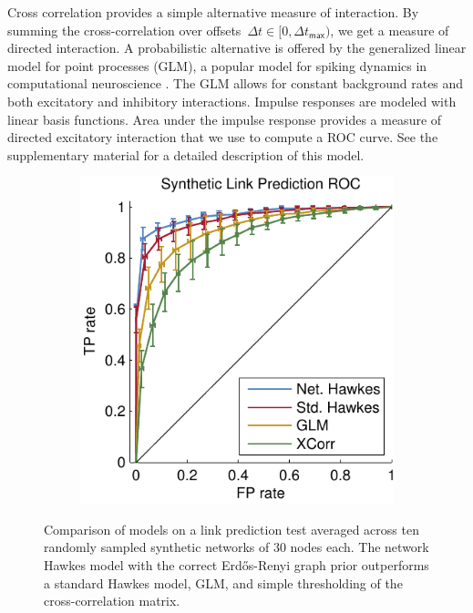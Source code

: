 Cross correlation provides a simple alternative measure of interaction. By summing the cross-correlation over offsets~${\Delta t\in[0,\Delta t_{\mathsf{max}})}$, we get a measure of directed interaction. A probabilistic alternative is offered by the generalized linear model for point processes (GLM), a popular model for spiking dynamics in computational neuroscience \cite{Paninski-2004}. The GLM allows for constant background rates and both excitatory and inhibitory interactions. Impulse responses are modeled with linear basis functions. Area under the impulse response provides a measure of directed excitatory interaction that we use to compute a ROC curve. See the supplementary material for a detailed description of this model.
\begin{figure}[t]
\begin{center}
\begin{subfigure}[T]{\linewidth}
\begin{center}
\includegraphics[width=.66\linewidth]{figures/ch2/synth_link_pred} 
\end{center}
\end{subfigure}
\end{center}
\caption{{\small Comparison of models on a link prediction test averaged across ten randomly sampled synthetic networks of 30 nodes each. The network Hawkes model with the correct Erd\H{o}s-Renyi graph prior outperforms a standard Hawkes model, GLM, and simple thresholding of the cross-correlation matrix.}}
\label{fig:synth_link_pred}
\vspace{-.5em}
\end{figure}

